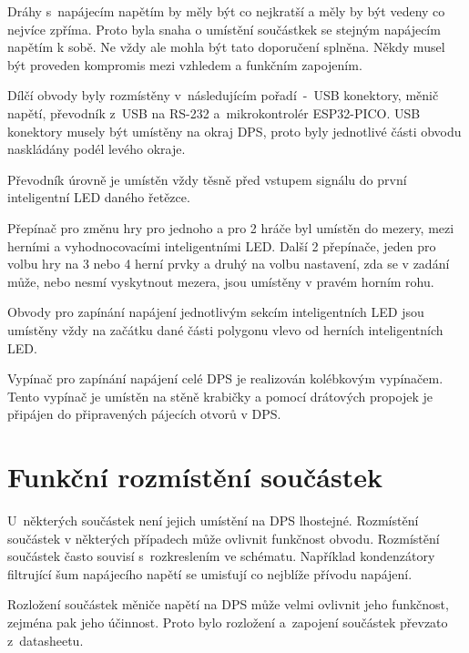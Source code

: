   Dráhy s~napájecím napětím by měly být co nejkratší a měly by být vedeny co nejvíce zpříma. Proto byla snaha o umístění součástkek
  se stejným napájecím napětím k sobě. Ne vždy ale mohla být tato doporučení splněna. Někdy musel být proveden kompromis mezi vzhledem a funkčním 
  zapojením. 

  Dílčí obvody byly rozmístěny v~následujícím pořadí~-~USB konektory, měnič napětí, převodník z~USB 
  na RS-232 a~mikrokontrolér ESP32-PICO. USB konektory musely být umístěny na okraj DPS, proto byly jednotlivé části obvodu naskládány podél levého okraje.

  Převodník úrovně je umístěn vždy těsně před vstupem signálu do první inteligentní LED daného řetězce.

  Přepínač pro změnu hry pro jednoho a pro 2 hráče byl umístěn do mezery, mezi herními a vyhodnocovacími inteligentními LED. Další 2 přepínače, jeden 
  pro volbu hry na 3 nebo 4 herní prvky a druhý na volbu nastavení, zda se v zadání může, nebo nesmí vyskytnout mezera, jsou umístěny v pravém 
  horním rohu. 

  Obvody pro zapínání napájení jednotlivým sekcím inteligentních LED jsou umístěny vždy na začátku dané části polygonu vlevo od herních inteligentních
  LED.

  Vypínač pro zapínání napájení celé DPS je realizován kolébkovým vypínačem. Tento vypínač je umístěn na stěně krabičky a pomocí drátových propojek 
  je připájen do připravených pájecích otvorů v DPS.

  \section{Funkční rozmístění součástek}
  U~některých součástek není jejich umístění na DPS lhostejné. Rozmístění součástek v některých případech může ovlivnit funkčnost obvodu. 
  Rozmístění součástek často souvisí s~rozkreslením ve schématu. Například kondenzátory filtrující šum napájecího napětí se umisťují co nejblíže přívodu 
  napájení.

  Rozložení součástek měniče napětí na DPS může velmi ovlivnit jeho funkčnost, zejména pak jeho účinnost. Proto bylo rozložení a~zapojení součástek 
  převzato z~datasheetu.

